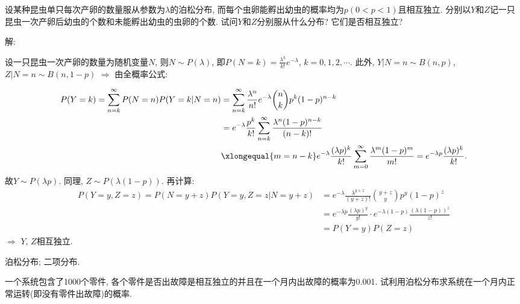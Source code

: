 \documentclass[standard]{ExBook}
\renewenvironment{shaded}{%
  \def\FrameCommand{\fboxsep=\FrameSep \colorbox{shadecolor}}%
  \MakeFramed{\advance\hsize-\width \FrameRestore}%
}{%
  \endMakeFramed
}
\begin{document}
\begin{qitems}
\vspace{2.5cm-5em}

    \begin{bbox}
    \begin{shaded}
        \qitem
设某种昆虫单只每次产卵的数量服从参数为$\lambda$的泊松分布, 而每个虫卵能孵出幼虫的概率均为$p(0 < p < 1)$且相互独立. 分别以$Y$和$Z$记一只昆虫一次产卵后幼虫的个数和未能孵出幼虫的虫卵的个数. 试问$Y$和$Z$分别服从什么分布? 它们是否相互独立?
    \end{shaded}
    \end{bbox}

\vspace{\dimexpr2.5cm-5em\relax}

解: 

设一只昆虫一次产卵的数量为随机变量$N$, 则$N\sim P(\lambda)$, 即$P(N=k)=\displaystyle\frac{\lambda^k}{k!}e^{-\lambda}$, $k=0,1,2,\cdots$. 此外, $Y|N=n\sim B(n,p)$, $Z|N=n\sim B(n,1-p)$ $\Longrightarrow$ 由全概率公式:

$$
\begin{aligned}
P(Y=k)=\sum\limits_{n=k}^{\infty}P(N=n)P(Y=k|N=n) & =\sum\limits_{n=k}^{\infty}\frac{\lambda^n}{n!}e^{-\lambda}\binom{n}{k}p^{k}(1-p)^{n-k}\\
 & =e^{-\lambda}\frac{p^k}{k!}\sum\limits_{n=k}^{\infty}\frac{\lambda^{n}(1-p)^{n-k}}{(n-k)!}\\
 & \xlongequal{m=n-k} e^{-\lambda}\frac{(\lambda p)^k}{k!}\sum\limits_{m=0}^{\infty}\frac{\lambda^{m}(1-p)^{m}}{m!} = e^{-\lambda p}\frac{(\lambda p)^{k}}{k!}.
\end{aligned}
$$
故$Y\sim P(\lambda p)$. 同理, $Z\sim P(\lambda(1-p))$.
再计算:
$$
\begin{aligned}
P(Y=y,Z=z)=P(N=y+z)P(Y=y,Z=z|N=y+z)&=e^{-\lambda}\frac{\lambda^{y+z}}{(y+z)!}\binom{y+z}{y}p^y(1-p)^z\\
&=e^{-\lambda p}\frac{(\lambda p)^y}{y!}\cdot e^{-\lambda(1-p)}\frac{(\lambda(1-p))^z}{z!}\\
&=P(Y=y)P(Z=z)
\end{aligned}
$$
$\Longrightarrow$ $Y$, $Z$相互独立.

\textcolor{themeColor}{\selectfont {} 泊松分布; 二项分布.}

\vspace{2.5cm-5em}

    \begin{bbox}
    \begin{shaded}
        \qitem
一个系统包含了1000个零件, 各个零件是否出故障是相互独立的并且在一个月内出故障的概率为0.001. 试利用泊松分布求系统在一个月内正常运转(即没有零件出故障)的概率.
    \end{shaded}
    \end{bbox}


\end{qitems}
\end{document}
